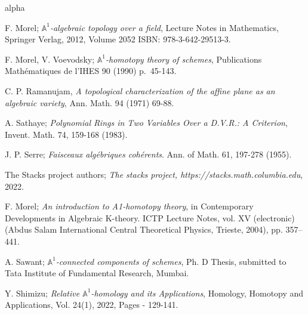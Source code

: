 \documentclass[11pt, reqno]{amsart}
\theoremstyle{plain}
\theoremstyle{definition}
\begin{document}
\begin{thebibliography}{alpha}
		
		
		 F. Morel; \emph{$\mathbb{A}^1$-algebraic topology over a field}, Lecture Notes in Mathematics, Springer Verlag, 2012, Volume 2052
		ISBN: 978-3-642-29513-3.
		
		 F. Morel, V. Voevodsky; \emph{$\mathbb{A}^1$-homotopy theory of schemes}, Publications Math\'ematiques de l'IHES 90 (1990)  p.~45-143.
		
		
		 C. P. Ramanujam, \emph{A topological characterization of the affine plane as an algebraic
			variety}, Ann. Math. 94 (1971) 69-88.
		
		
		
		 A. Sathaye; \emph{Polynomial Rings in Two Variables Over a D.V.R.: A Criterion}, Invent. Math. 74, 159-168 (1983).  
		
		 J. P. Serre; \emph{Faisceaux alg\'ebriques coh\'erents}. Ann. of Math. 61, 197-278 (1955). 
		
		 The Stacks project authors; \emph{The stacks project, https://stacks.math.columbia.edu}, 2022.

 F. Morel; \emph{An introduction to A1-homotopy theory}, in Contemporary Developments in Algebraic K-theory. ICTP Lecture Notes, vol. XV (electronic) (Abdus Salam International Central Theoretical Physics, Trieste, 2004), pp. 357–441.
		
		 A. Sawant; \emph{$\mathbb{A}^1$-connected components of schemes}, Ph. D Thesis, submitted to Tata Institute of Fundamental Research, Mumbai.
		
		 Y. Shimizu; \emph{Relative $\mathbb{A}^1$-homology and its Applications}, Homology, Homotopy and Applications, Vol. 24(1), 2022, Pages - 129-141.
		
		

\end{thebibliography}
\end{document}
